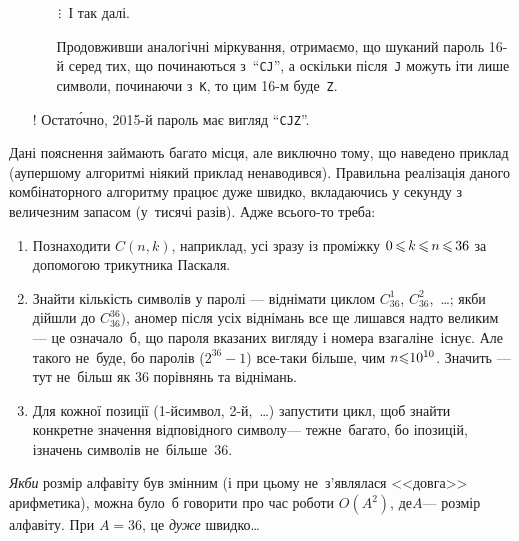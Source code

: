 \documentclass[14pt,a4paper]{extarticle}
\def\dib#1{\,#1\discretionary{}{\mbox{$#1$}}{}\,}
\begin{document}
\begin{small}
\begin{itemize}
\begin{itemize}
\item[$\isdiv$] І так далі.

\item[\textopenbullet] Продовживши аналогічні міркування, отримаємо, що шуканий пароль 16-й серед тих, що починаються з~``\texttt{CJ}'', а оскільки після~\texttt{J} можуть іти лише символи, починаючи з~\texttt{K}, то цим 16-м буде~\texttt{Z}.
\end{itemize}

\item[!] Остат\'{о}чно, 2015-й пароль має вигляд ``\texttt{CJZ}''.
\end{itemize}
\end{small}

Дані пояснення займають багато місця, але виключно тому, що наведено приклад (а\nolinebreak[3] у\nolinebreak[3] першому алгоритмі ніякий приклад не\nolinebreak[3] наводився). Правильна реалізація даного комбінаторного алгоритму працює дуже швидко, вкладаючись у секунду з величезним запасом (у~тисячі разів). Адже всього-то треба:

\begin{enumerate}

\item
Познаходити $C(n,k)$, наприклад, усі зразу із проміжку $0\dib{{\<}}k\dib{{\<}}n\dib{{\<}}36$ за допомогою трикутника Паскаля.

\item
Знайти кількість символів у паролі --- віднімати циклом $C_{36}^1$, $C_{36}^2$,~\dots; якби дійшли до $C_{36}^{36})$, а\nolinebreak[3] номер після усіх віднімань все ще лишався надто великим --- це означало~б, що пароля вказаних вигляду і номера взагалі\nolinebreak[2] не~існує. Але такого не~буде, бо паролів ($2^{36}-1$) все-таки більше, чим $n{\leqslant}10^{10}$. Значить --- тут %
не~більш як 36 порівнянь та віднімань.

\item
Для кожної позиції (1-й\nolinebreak[3] символ, 2-й,~\dots) запустити цикл, щоб знайти конкретне значення відповідного символу\nolinebreak[3] --- теж\nolinebreak[3] не~багато, бо і\nolinebreak[3] позицій, і\nolinebreak[3] значень символів не~більше~36.

\end{enumerate}


\emph{Якби} розмір алфавіту був змінним (і при цьому не~з'являлася <<довга>> арифметика), можна було~б говорити про час роботи $O(A^2)$, де\nolinebreak[3] $A$\nolinebreak[3] --- розмір алфавіту. При $A{=}36$, це \emph{дуже} швидко\dots
\end{document}
